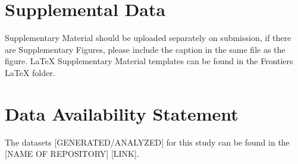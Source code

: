 \documentclass[utf8]{FrontiersinHarvard} %
\providecommand{\href}[2]{#2}
\renewcommand*{\|}[1][]{\nonscript\:#1\vert\nonscript\:\mathopen{}}
\begin{document}
\section*{Supplemental Data}
 \href{http://home.frontiersin.org/about/author-guidelines#SupplementaryMaterial}{Supplementary Material} should be uploaded separately on submission, if there are Supplementary Figures, please include the caption in the same file as the figure. LaTeX Supplementary Material templates can be found in the Frontiers LaTeX folder.

\section*{Data Availability Statement}
The datasets [GENERATED/ANALYZED] for this study can be found in the [NAME OF REPOSITORY] [LINK].





\end{document}
